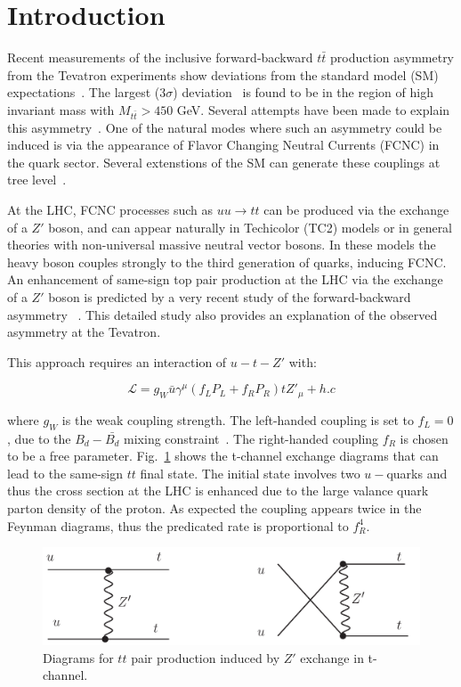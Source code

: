 \section{Introduction}
\label{sec:intro}

Recent measurements of the inclusive forward-backward $t\bar{t}$ production asymmetry from the 
Tevatron experiments show deviations from the standard model (SM) expectations~\cite{d0:fwtop, cdf:fwtop1, cdf:fwtop2}.
The largest (3$\sigma$) deviation~\cite{cdf:fwtop2} is found to be in the region of high invariant mass with $M_{t\bar{t}} >  450$ GeV. 
Several attempts have been made to explain this asymmetry~\cite{berger, Buckley, Gresham, zoltan}. 
One of the natural modes where such an asymmetry could be induced is via the appearance of Flavor Changing Neutral Currents (FCNC) in the quark sector. 
Several extenstions of the SM can generate these couplings at tree level~\cite{hills, others1}.

At the LHC, FCNC processes such as $uu \rightarrow tt$ can be produced via the exchange of a $Z'$ boson, 
and can appear naturally in Techicolor (TC2) models or in general theories with non-universal massive neutral vector bosons. 
In these models the heavy boson couples strongly to the third generation of quarks, inducing FCNC. 
An enhancement of same-sign top pair production at the LHC via the exchange of a $Z'$ boson is predicted
by a very recent study of the forward-backward asymmetry ~\cite{berger}.
This detailed study also provides an explanation of the observed asymmetry at the Tevatron. 

This approach requires an interaction of $u-t-Z'$ with:

\begin{equation}
  \mathcal{L} = g_W \bar{u} \gamma^\mu (f_L P_L + f_R P_R)tZ'_\mu + h.c
\end{equation}

where $g_W$ is the weak coupling strength. The left-handed coupling is set to $f_L = 0$, due 
to the $B_d-\bar{B_d}$ mixing constraint~\cite{Cao}. The right-handed coupling $f_R$ is chosen to be a free parameter. 
Fig.~\ref{fig:tchannel} shows the t-channel exchange diagrams that can lead to the same-sign $tt$ final state. 
The initial state involves two $u-$quarks and thus the cross section at the LHC is enhanced due to the large valance quark parton density of the proton. 
As expected the coupling appears twice in the Feynman diagrams, thus the predicated rate is proportional to $f_R^4$. 

\begin{figure}[htb]
\begin{center}
\includegraphics[width=0.7\linewidth, height=0.2\linewidth]{figs/sstop1.pdf}
\caption{ Diagrams for $tt$ pair production induced by $Z'$ exchange in t-channel. \label{fig:tchannel}}
\end{center}
\end{figure}

